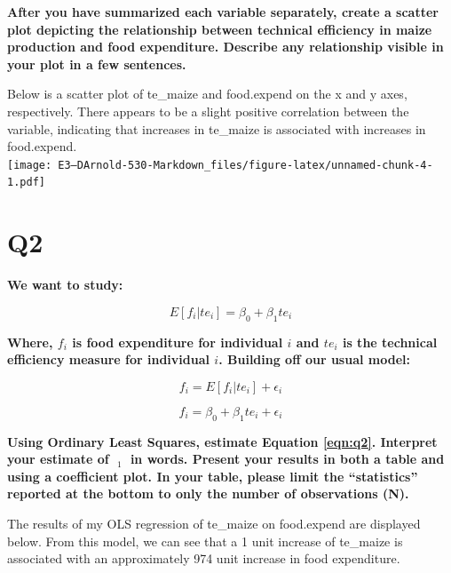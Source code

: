 \documentclass[
]{article}
\begin{document}
\hfill\break

\hfill\break

\hfill\break

\textbf{After you have summarized each variable separately, create a
scatter plot depicting the relationship between technical efficiency in
maize production and food expenditure. Describe any relationship visible
in your plot in a few sentences.}

\hfill\break
Below is a scatter plot of te\_maize and food.expend on the x and y
axes, respectively. There appears to be a slight positive correlation
between the variable, indicating that increases in te\_maize is
associated with increases in food.expend.\\
\texttt{[image: E3---DArnold-530-Markdown\_files/figure-latex/unnamed-chunk-4-1.pdf]}

\hfill\break

\hfill\break

\hfill\break

\hypertarget{q2}{%
\section{Q2}\label{q2}}

\textbf{We want to study:}

\[E[f_i|te_i] = \beta_0 + \beta_1 te_i\]

\textbf{Where, \(f_i\) is food expenditure for individual \(i\) and
\(te_i\) is the technical efficiency measure for individual \(i\).
Building off our usual model:}

\[ f_i = E[f_i|te_i] + \epsilon_i\]

\[\begin{equation} 
\tag{1} \label{eqn:q2}
    f_i = \beta_0 + \beta_1 te_i + \epsilon_i
\end{equation}\]

\textbf{Using Ordinary Least Squares, estimate Equation \ref{eqn:q2}.
Interpret your estimate of \(\mathop{\mathrm{\hat{\beta}}}_1\) in words.
Present your results in both a table and using a coefficient plot. In
your table, please limit the ``statistics'' reported at the bottom to
only the number of observations (N).}

\hfill\break
The results of my OLS regression of te\_maize on food.expend are
displayed below. From this model, we can see that a 1 unit increase of
te\_maize is associated with an approximately 974 unit increase in food
expenditure.

\hfill\break
\end{document}

